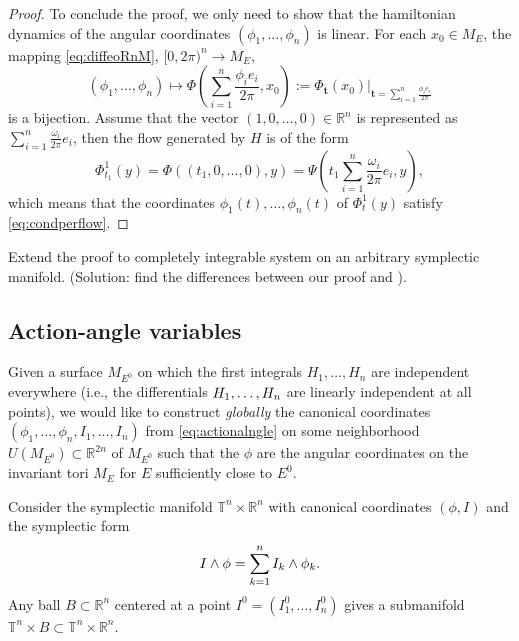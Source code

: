 \documentclass[english,fontsize=11pt,paper=a5,oneside]{scrbook}
\newcommand{\R}{\mathbb{R}}
\newcommand{\T}{\mathbb{T}}
\let\d\relax
\newcommand{\d}{\mathrm{d}}
\theoremstyle{definition}
\newenvironment{exercise}
  {\pushQED{\qed}\renewcommand{\qedsymbol}{$\maltese$}\exercisex}
  {\popQED\endexercisex}
\begin{document}
\begin{proof}
  To conclude the proof, we only need to show that the hamiltonian dynamics of the angular coordinates $(\phi_1, \ldots, \phi_n)$ is linear.
  For each $x_0\in M_E$, the mapping \eqref{eq:diffeoRnM}, $[0, 2\pi)^n \to M_E$,
  \begin{equation}
    (\phi_1, \ldots, \phi_n)\mapsto \Phi\left(\sum_{i=1}^n \frac{\phi_i e_i}{2\pi}, x_0\right) := \Phi_{\bm t}(x_0)\Big|_{\bm t = \sum_{i=1}^n \frac{\phi_i e_i}{2\pi}}
  \end{equation}
  is a bijection.
  Assume that the vector $(1, 0, \ldots, 0)\in\R^n$ is represented as $\sum_{i=1}^n \frac{\omega_i}{2\pi} e_i$, then the flow generated by $H$ is of the form
  \begin{equation}
    \Phi^1_{t_1}(y) = \Phi((t_1, 0, \ldots, 0), y)
    = \Psi\left(t_1 \sum_{i=1}^n \frac{\omega_i}{2\pi}e_i, y\right),
  \end{equation}
  which means that the coordinates $\phi_1(t), \ldots, \phi_n(t)$ of $\Phi_t^1(y)$ satisfy \eqref{eq:condperflow}.
\end{proof}

\begin{exercise}
  Extend the proof to completely integrable system on an arbitrary symplectic manifold. (Solution: find the differences between our proof and \cite[Theorem 13.3]{book:knauf}).
\end{exercise}

\subsection{Action-angle variables}

Given a surface $M_{E^0}$ on which the first integrals $H_1, \ldots, H_n$ are independent everywhere (i.e., the differentials $\d H_1, \ldots, \d H_n$ are linearly independent at all points), we would like to construct \emph{globally} the canonical coordinates $(\phi_1, \ldots, \phi_n, I_1, \ldots, I_n)$ from \eqref{eq:actionalngle} on some neighborhood $U(M_{E^0})\subset \R^{2n}$ of $M_{E^0}$ such that the $\phi$ are the angular coordinates on the invariant tori $M_E$ for $E$ sufficiently close to $E^0$.

Consider the symplectic manifold $\T^n \times \R^n$ with canonical coordinates $(\phi, I)$ and the symplectic form
\begin{equation}
  \d I \wedge \d \phi = \sum_{k=1}^n \d I_k \wedge \d \phi_k.
\end{equation}
Any ball $B\subset\R^n$ centered at a point $I^0 = (I^0_1, \ldots, I^0_n)$ gives a submanifold $\T^n\times B \subset \T^n \times \R^n$.
\end{document}
